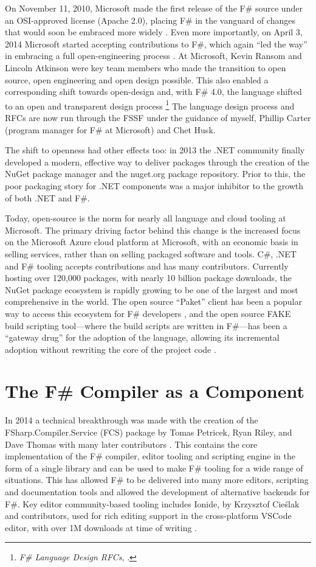 \documentclass[acmsmall,screen]{acmart}
\begin{document}
On November 11, 2010, Microsoft made the first release of the F\# source under an OSI-approved
license (Apache 2.0), placing F\# in the vanguard of changes that would soon be embraced more widely \citep{RefCodeDrop}.
Even more importantly, on April 3, 2014 Microsoft started accepting contributions to F\#, which again “led the way” in embracing
a full open-engineering process \citep{RefOpenContrib}.
At Microsoft, Kevin Ransom and Lincoln Atkinson were key team members who made the transition to open source, open engineering and open design possible.
This also enabled a corresponding shift towards open-design and, with F\# 4.0, the
language shifted to an open and transparent design process \footnote{\textit{F\# Language Design RFCs}, \citep{RefRFCs}.}
The language design process and RFCs are now run through the FSSF under the guidance of myself, Phillip Carter (program manager for F\# at Microsoft) and Chet Husk.


The shift to openness had other effects too: in 2013 the .NET community finally developed a modern, effective way to
deliver packages through the creation of the NuGet package manager and the nuget.org package repository.  Prior to
this, the poor packaging story for .NET components was a major inhibitor to the growth of both .NET and F\#.  


Today, open-source is the norm for nearly all language and cloud tooling at Microsoft. The primary driving factor
behind this change is the increased focus on the Microsoft Azure cloud platform at Microsoft, with an economic basis in
selling services, rather than on selling packaged software and tools. C\#, .NET and F\# tooling accepts contributions and
has many contributors. Currently hosting over 120,000 packages, with nearly 10 billion package downloads, the NuGet
package ecosystem is rapidly growing to be one of the largest and most comprehensive in the world.  The open source ``Paket''
client has been a popular way to access this ecosystem for F\#
developers \citep{RefPaket}, and
the open source FAKE build scripting tool---where the build scripts are written in F\#---has been a “gateway drug” for the adoption of the language, allowing its
incremental adoption without rewriting the core of the project code \citep{RefFAKE}.

\section*{The F\# Compiler as a Component}

In 2014 a technical breakthrough was made with the creation of the FSharp.Compiler.Service (FCS) package by
Tomas Petricek, Ryan Riley, and Dave Thomas with many later contributors \citep{RefFCS}.
This contains the core implementation of the F\# compiler, editor tooling and scripting engine in the form of a single library and can be used to make F\# tooling
for a wide range of situations.  This has allowed F\# to be delivered into many more editors, scripting and documentation
tools and allowed the development of alternative backends for F\#.   Key editor community-based tooling includes
Ionide, by Krzysztof Cieślak and contributors, used for rich editing support in the cross-platform VSCode editor, with over 1M downloads at time
of writing \citep{RefIonide}.
\end{document}
